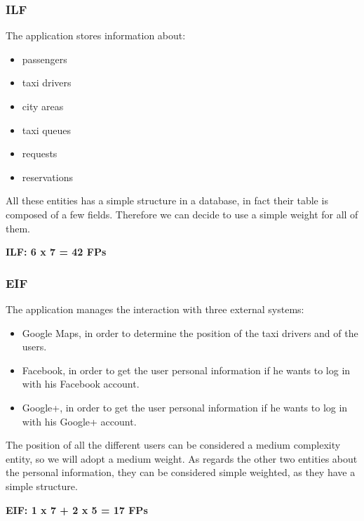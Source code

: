 		\subsubsection{ILF}
			The application stores information about:
			\begin{itemize}
				\item passengers
				\item taxi drivers
				\item city areas
				\item taxi queues
				\item requests
				\item reservations
			\end{itemize}
			All these entities has a simple structure in a database, in fact their table is composed of a few fields. Therefore we can decide to use a simple weight for all of them.
			\begin{center}
				\textbf{ILF: 6 x 7 = 42 FPs}
			\end{center}
		\subsubsection{EIF}
			The application manages the interaction with three external systems:
			\begin{itemize}
				\item Google Maps, in order to determine the position of the taxi drivers and of the users.
				\item Facebook, in order to get the user personal information if he wants to log in with his Facebook account.
				\item Google+, in  order to get the user personal information if he wants to log in with his Google+ account.
			\end{itemize}
			The position of all the different users can be considered a medium complexity entity, so we will adopt a medium weight. As regards the other two entities about the personal information, they can be considered simple weighted, as they have a simple structure.\\
			\begin{center}
				\textbf{EIF: 1 x 7 + 2 x 5 = 17 FPs}
			\end{center}
